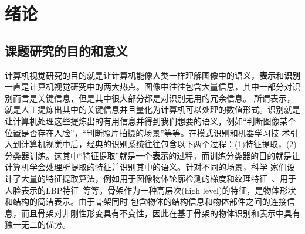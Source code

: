 \documentclass[UTF8]{ctexart}
\numberwithin{equation}{section} %
\numberwithin{table}{section} %
\begin{document}

\setcounter{page}{9}  %

{\hypersetup{linkcolor=black}
\tableofcontents}

\pagebreak
\section{绪论}
\setcounter{page}{1}
\subsection{课题研究的目的和意义}
计算机视觉研究的目的就是让计算机能像人类一样理解图像中的语义，\textbf{表示}和\textbf{识别}一直是计算机视觉研究中的两大热点。图像中往往包含大量信息，其中一部分对识别而言是关键信息，但是其中很大部分都是对识别无用的冗余信息。
所谓表示，就是人工提炼出其中的关键信息并且量化为计算机可以处理的数值形式。识别就是让计算机处理这些提炼出的有用信息并得到我们想要的语义，例如“判断图像某个位置是否存在人脸”，“判断照片拍摄的场景”等等。在模式识别和机器学习技
术引入到计算机视觉中后，经典的识别系统往往包含以下两个过程：(1)特征提取，(2)分类器训练。这其中“特征提取”就是一个\textbf{表示}的过程，而训练分类器的目的就是让计算机学会处理所提取的特征并识别其中的语义。针对不同的场景，科学
家们设计了大量的特征提取算法，例如用于图像物体轮廓检测的梯度和纹理特征~\cite{Lim_2013_CVPR}、用于人脸表示的LBP特征~\cite{ahonen2006face}等等。骨架作为一种高层次(high level)的特征，是物体形状和结构的简洁表示。由于骨架同时
包含物体的结构信息和物体部件之间的连接信息，而且骨架对非刚性形变具有不变性，因此在基于骨架的物体识别和表示中具有独一无二的优势。
\end{document}
